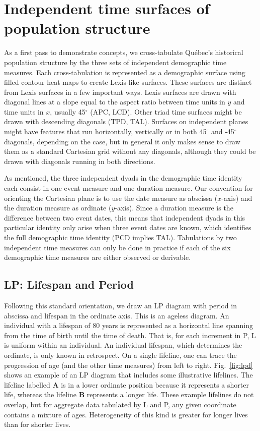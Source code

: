 \documentclass{bmcart}
\begin{document}
\section*{Independent time surfaces of population structure}
As a first pass to demonstrate concepts, we cross-tabulate Qu\'{e}bec's historical population structure by the three sets of independent demographic time measures. Each cross-tabulation is represented as a demographic surface using filled contour heat maps to create Lexis-like surfaces. These surfaces are distinct from Lexis surfaces in a few important ways. Lexis surfaces are drawn with diagonal lines at a slope equal to the aspect ratio between time units in $y$ and time units in $x$, usually 45$^\circ$ (APC, LCD). Other triad time surfaces might be drawn with descending diagonals (TPD, TAL). Surfaces on independent planes might have features that run horizontally, vertically or in both 45$^\circ$ and -45$^\circ$ diagonals, depending on the case, but in general it only makes sense to draw them as a standard Cartesian grid without any diagonals, although they could be drawn with diagonals running in both directions. 

As mentioned, the three independent dyads in the demographic time identity each consist in one event measure and one duration measure. Our convention for orienting the Cartesian plane is to use the date measure as abscissa ($x$-axis) and the duration measure as ordinate ($y$-axis). Since a duration measure is the difference between two event dates, this means that independent dyads in this particular identity only arise when three event dates are known, which identifies the full demographic time identity (PCD implies TAL). Tabulations by two independent time measures can only be done in practice if each of the six demographic time measures are either observed or derivable. 

\subsection*{LP: Lifespan and Period}
Following this standard orientation, we draw an LP diagram with period in abscissa and lifespan in the ordinate axis. This is an ageless diagram. An individual with a lifespan of 80 years is represented as a horizontal line spanning from the time of birth until the time of death. That is, for each increment in P, L is uniform within an individual. An individual lifespan, which determines the ordinate, is only known in retrospect. On a single lifeline, one can trace the progression of age (and the other time measures) from left to right.  Fig.~\ref{fig:lpd} shows an example of an LP diagram that includes some illustrative lifelines. The lifeline labelled \textbf{A} is in a lower ordinate position because it represents a shorter life, whereas the lifeline \textbf{B} represents a longer life. These example lifelines do not overlap, but for aggregate data tabulated by L and P, any given coordinate contains a mixture of ages. Heterogeneity of this kind is greater for longer lives than for shorter lives.
\end{document}
